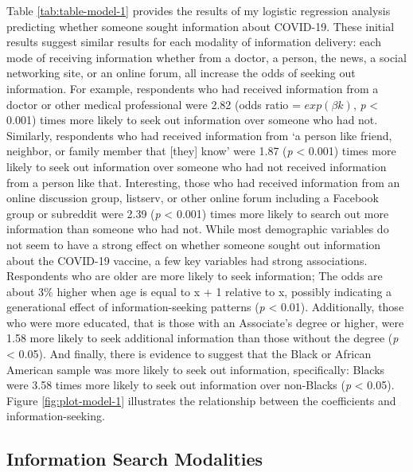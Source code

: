 Table \ref{tab:table-model-1} provides the results of my logistic regression
analysis predicting whether someone sought information about COVID-19. These
initial results suggest similar results for each modality of information
delivery: each mode of receiving information whether from a doctor, a person,
the news, a social networking site, or an online forum, all increase the odds of
seeking out information. For example, respondents who had received information
from a doctor or other medical professional were 2.82 (odds ratio = \(exp(\beta k)\),
\emph{p} \textless{} 0.001) times more likely to seek out information over someone
who had not. Similarly, respondents who had received information from `a
person like friend, neighbor, or family member that [they] know' were 1.87
(\emph{p} \textless{} 0.001) times more likely to seek out information over 
someone who had not received information from a person like that. Interesting, 
those who had received information from an online discussion group, listserv,
or other online forum including a Facebook group or subreddit were 2.39 (\emph{p}
\textless{} 0.001) times more likely to search out more information than 
someone who had not. While most demographic variables do not seem to have a 
strong effect on whether someone sought out information about the COVID-19 
vaccine, a few key variables had strong associations.  Respondents who are 
older are more likely to seek information; The odds are about 3\% higher when 
age is equal to x + 1 relative to x, possibly indicating a generational effect
of information-seeking patterns (\emph{p} \textless{} 0.01). Additionally,
those who were more educated, that is those with an Associate's degree or higher,
were 1.58 more likely to seek additional information than those without the degree
(\emph{p} \textless{} 0.05). And finally, there is evidence to suggest that the Black or
African American sample was more likely to seek out information, specifically:
Blacks were 3.58 times more likely to seek out information over non-Blacks (\emph{p}
\textless{} 0.05). Figure \ref{fig:plot-model-1} illustrates the relationship
between the coefficients and information-seeking.

\hypertarget{information-search-modalities}{%
\subsection{Information Search Modalities}\label{information-search-modalities}}



